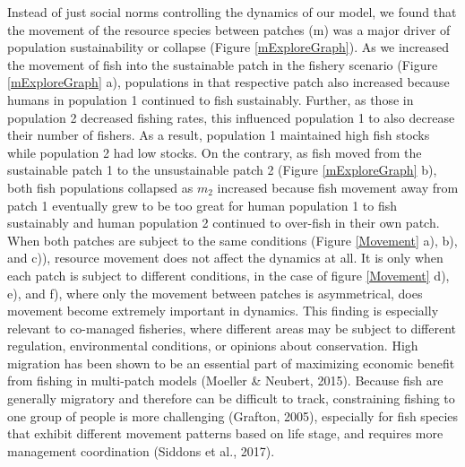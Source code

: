 \documentclass[
  12pt,
]{article}
\begin{document}
Instead of just social norms controlling the dynamics of our model, we found that the movement of the resource species between patches (m) was a major driver of population sustainability or collapse (Figure \ref{mExploreGraph}). As we increased the movement of fish into the sustainable patch in the fishery scenario (Figure \ref{mExploreGraph} a), populations in that respective patch also increased because humans in population 1 continued to fish sustainably. Further, as those in population 2 decreased fishing rates, this influenced population 1 to also decrease their number of fishers. As a result, population 1 maintained high fish stocks while population 2 had low stocks. On the contrary, as fish moved from the sustainable patch 1 to the unsustainable patch 2 (Figure \ref{mExploreGraph} b), both fish populations collapsed as \(m_2\) increased because fish movement away from patch 1 eventually grew to be too great for human population 1 to fish sustainably and human population 2 continued to over-fish in their own patch. When both patches are subject to the same conditions (Figure \ref{Movement} a), b), and c)), resource movement does not affect the dynamics at all. It is only when each patch is subject to different conditions, in the case of figure \ref{Movement} d), e), and f), where only the movement between patches is asymmetrical, does movement become extremely important in dynamics. This finding is especially relevant to co-managed fisheries, where different areas may be subject to different regulation, environmental conditions, or opinions about conservation. High migration has been shown to be an essential part of maximizing economic benefit from fishing in multi-patch models (Moeller \& Neubert, 2015). Because fish are generally migratory and therefore can be difficult to track, constraining fishing to one group of people is more challenging (Grafton, 2005), especially for fish species that exhibit different movement patterns based on life stage, and requires more management coordination (Siddons et al., 2017).
\end{document}
